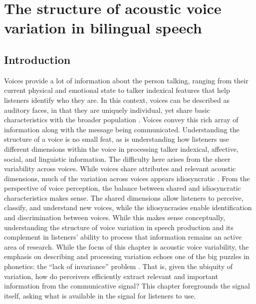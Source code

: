 
\chapter{The structure of acoustic voice variation in bilingual speech}
\label{ch3:Voice}



\section{Introduction}\label{ch3:sec:introduction}
Voices provide a lot of information about the person talking, ranging from their current physical and emotional state to talker indexical features that help listeners identify who they are. In this context, voices can be described as auditory faces, in that they are uniquely individual, yet share basic characteristics with the broader population \citep{belin_2004_voice}. Voices convey this rich array of information along with the message being communicated. Understanding the structure of a voice is no small feat, as is understanding how listeners use different dimensions within the voice in processing talker indexical, affective, social, and linguistic information. The difficulty here arises from the sheer variability across voices. While voices share attributes and relevant acoustic dimensions, much of the variation across voices appears idiosyncratic \citep{lee_2019_acoustic}. From the perspective of voice perception, the balance between shared and idiosyncratic characteristics makes sense. The shared dimensions allow listeners to perceive, classify, and understand new voices, while the idiosyncrasies enable identification and discrimination between voices. While this makes sense conceptually, understanding the structure of voice variation in speech production and its complement in listeners' ability to process that information remains an active area of research. While the focus of this chapter is acoustic voice variability, the emphasis on describing and processing variation echoes one of the big puzzles in phonetics: the ``lack of invariance'' problem \citep{liberman_1967_perception}. That is, given the ubiquity of variation, how do perceivers efficiently extract relevant and important information from the communicative signal? This chapter foregrounds the signal itself, asking what is available in the signal for listeners to use. 

